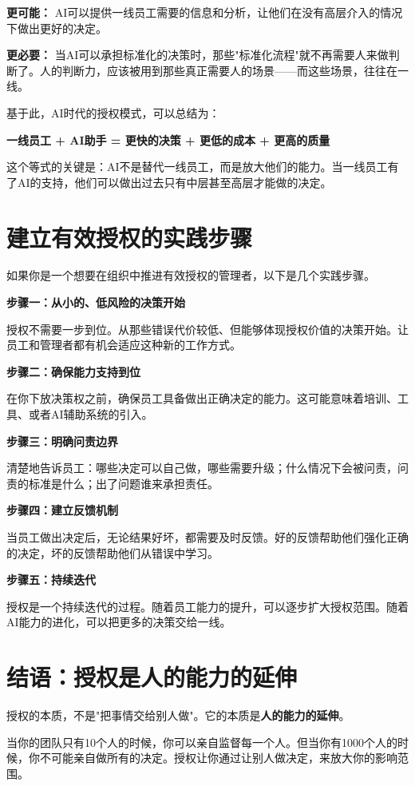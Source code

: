 \textbf{更可能：} AI可以提供一线员工需要的信息和分析，让他们在没有高层介入的情况下做出更好的决定。

\textbf{更必要：} 当AI可以承担标准化的决策时，那些"标准化流程"就不再需要人来做判断了。人的判断力，应该被用到那些真正需要人的场景——而这些场景，往往在一线。

基于此，AI时代的授权模式，可以总结为：

\textbf{一线员工 + AI助手 = 更快的决策 + 更低的成本 + 更高的质量}

这个等式的关键是：AI不是替代一线员工，而是放大他们的能力。当一线员工有了AI的支持，他们可以做出过去只有中层甚至高层才能做的决定。

\section{建立有效授权的实践步骤}


如果你是一个想要在组织中推进有效授权的管理者，以下是几个实践步骤。

\textbf{步骤一：从小的、低风险的决策开始}

授权不需要一步到位。从那些错误代价较低、但能够体现授权价值的决策开始。让员工和管理者都有机会适应这种新的工作方式。

\textbf{步骤二：确保能力支持到位}

在你下放决策权之前，确保员工具备做出正确决定的能力。这可能意味着培训、工具、或者AI辅助系统的引入。

\textbf{步骤三：明确问责边界}

清楚地告诉员工：哪些决定可以自己做，哪些需要升级；什么情况下会被问责，问责的标准是什么；出了问题谁来承担责任。

\textbf{步骤四：建立反馈机制}

当员工做出决定后，无论结果好坏，都需要及时反馈。好的反馈帮助他们强化正确的决定，坏的反馈帮助他们从错误中学习。

\textbf{步骤五：持续迭代}

授权是一个持续迭代的过程。随着员工能力的提升，可以逐步扩大授权范围。随着AI能力的进化，可以把更多的决策交给一线。

\section{结语：授权是人的能力的延伸}


授权的本质，不是"把事情交给别人做"。它的本质是\textbf{人的能力的延伸}。

当你的团队只有10个人的时候，你可以亲自监督每一个人。但当你有1000个人的时候，你不可能亲自做所有的决定。授权让你通过让别人做决定，来放大你的影响范围。

